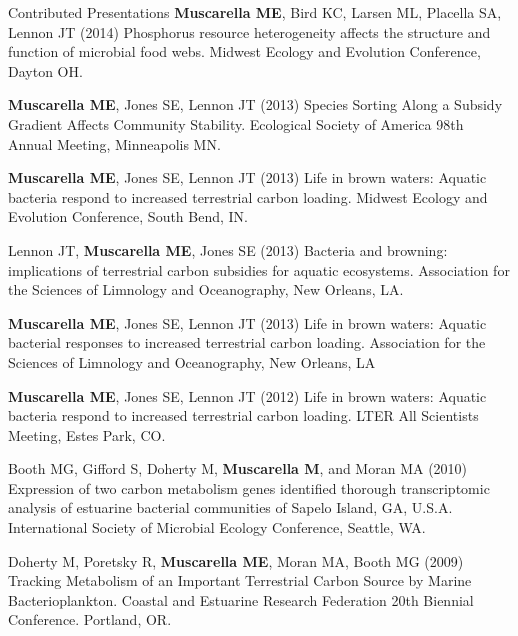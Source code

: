 \documentclass{resume} %
\begin{document}
\begin{rSection}{Contributed Presentations}
  {\bf Muscarella ME}, Bird KC, Larsen ML, Placella SA, Lennon JT (2014)
  Phosphorus resource heterogeneity affects the structure and function of
  microbial food webs. Midwest Ecology and Evolution Conference, Dayton OH.

  {\bf Muscarella ME}, Jones SE, Lennon JT (2013) Species Sorting Along a
  Subsidy Gradient Affects Community Stability. Ecological Society of America
  98th Annual Meeting, Minneapolis MN.

  {\bf Muscarella ME}, Jones SE, Lennon JT (2013) Life in brown waters: Aquatic
  bacteria respond to increased terrestrial carbon loading. Midwest Ecology and
  Evolution Conference, South Bend, IN.

  Lennon JT, {\bf Muscarella ME}, Jones SE (2013) Bacteria and browning:
  implications of terrestrial carbon subsidies for aquatic ecosystems.
  Association for the Sciences of Limnology and Oceanography, New Orleans, LA.

  {\bf Muscarella ME}, Jones SE, Lennon JT (2013) Life in brown waters: Aquatic
  bacterial responses to increased terrestrial carbon loading. Association for
  the Sciences of Limnology and Oceanography, New Orleans, LA

  {\bf Muscarella ME}, Jones SE, Lennon JT (2012) Life in brown waters: Aquatic
  bacteria respond to increased terrestrial carbon loading. LTER All Scientists
  Meeting, Estes Park, CO.

  Booth MG, Gifford S, Doherty M, {\bf Muscarella M}, and Moran MA (2010)
  Expression of two carbon metabolism genes identified thorough transcriptomic
  analysis of estuarine bacterial communities of Sapelo Island, GA, U.S.A.
  International Society of Microbial Ecology Conference, Seattle, WA.

  Doherty M, Poretsky R, {\bf Muscarella ME}, Moran MA, Booth MG (2009) Tracking
  Metabolism of an Important Terrestrial Carbon Source by Marine
  Bacterioplankton. Coastal and Estuarine Research Federation 20th Biennial
  Conference. Portland, OR.


\end{rSection}
\end{document}
